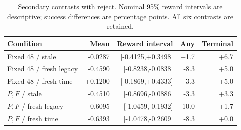\documentclass[10pt,a4paper]{article}
\begin{document}
\renewcommand{\thetable}{S\arabic{table}}
\setcounter{table}{18}
\begin{table}[H]\centering\small
\caption{Secondary contrasts with reject. Nominal 95\% reward intervals are descriptive; success differences are percentage points. All six contrasts are retained.}
\setlength{\tabcolsep}{3pt}\begin{tabular}{lrrrr}\toprule Condition & Mean & Reward interval & Any & Terminal\\\midrule
Fixed 48 / stale & -0.0287 & [-0.4125,+0.3498] & +1.7 & +6.7\\
Fixed 48 / fresh legacy & -0.4590 & [-0.8238,-0.0838] & -8.3 & +5.0\\
Fixed 48 / fresh time & +0.1200 & [-0.1869,+0.4333] & -3.3 & +5.0\\
$P,F$ / stale & -0.4510 & [-0.8696,-0.0886] & -3.3 & +3.3\\
$P,F$ / fresh legacy & -0.6095 & [-1.0459,-0.1932] & -10.0 & +1.7\\
$P,F$ / fresh time & -0.6393 & [-1.0478,-0.2609] & -8.3 & +0.0\\
\bottomrule\end{tabular}\end{table}
\end{document}

